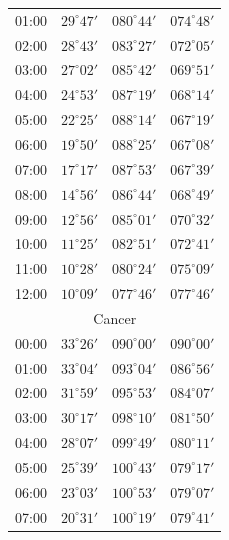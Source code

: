 \begin{table}[!h]
\begin{Parallel}{}{}
{{\begin{tabular}{l|lll}
01:00 & $29^\circ 47'$ & $080^\circ 44'$& $074^\circ 48'$ \\
02:00 & $28^\circ 43'$ & $083^\circ 27'$& $072^\circ 05'$ \\
03:00 & $27^\circ 02'$ & $085^\circ 42'$& $069^\circ 51'$ \\
04:00 & $24^\circ 53'$ & $087^\circ 19'$& $068^\circ 14'$ \\
05:00 & $22^\circ 25'$ & $088^\circ 14'$& $067^\circ 19'$ \\
06:00 & $19^\circ 50'$ & $088^\circ 25'$& $067^\circ 08'$ \\
07:00 & $17^\circ 17'$ & $087^\circ 53'$& $067^\circ 39'$ \\
08:00 & $14^\circ 56'$ & $086^\circ 44'$& $068^\circ 49'$ \\
09:00 & $12^\circ 56'$ & $085^\circ 01'$& $070^\circ 32'$ \\
10:00 & $11^\circ 25'$ & $082^\circ 51'$& $072^\circ 41'$ \\
11:00 & $10^\circ 28'$ & $080^\circ 24'$& $075^\circ 09'$ \\
12:00 & $10^\circ 09'$ & $077^\circ 46'$& $077^\circ 46'$ \\
\multicolumn{4}{c}{Cancer}\\
00:00 & $33^\circ 26'$ & $090^\circ 00'$& $090^\circ 00'$ \\
01:00 & $33^\circ 04'$ & $093^\circ 04'$& $086^\circ 56'$ \\
02:00 & $31^\circ 59'$ & $095^\circ 53'$& $084^\circ 07'$ \\
03:00 & $30^\circ 17'$ & $098^\circ 10'$& $081^\circ 50'$ \\
04:00 & $28^\circ 07'$ & $099^\circ 49'$& $080^\circ 11'$ \\
05:00 & $25^\circ 39'$ & $100^\circ 43'$& $079^\circ 17'$ \\
06:00 & $23^\circ 03'$ & $100^\circ 53'$& $079^\circ 07'$ \\
07:00 & $20^\circ 31'$ & $100^\circ 19'$& $079^\circ 41'$ \\
\end{tabular}
}}
\end{Parallel}
\end{table}
